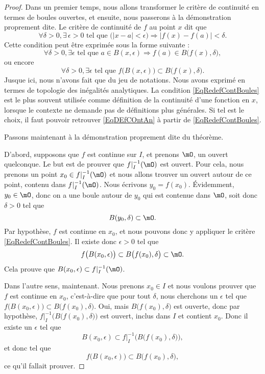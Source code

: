 \begin{proof}

	Dans un premier temps, nous allons transformer le critère de continuité en termes de boules ouvertes, et ensuite, nous passerons à la démonstration proprement dite. Le critère de continuité de \( f\) au point \( x\) dit que
	\begin{equation}        \label{EqDEfCOntAn}
		\forall \delta>0, \exists\,\epsilon>0\text{ tel que }\big( | x-a |< \epsilon \big)\Rightarrow| f(x)-f(a) |<\delta.
	\end{equation}
	Cette condition peut être exprimée sous la forme suivante :
	\[
		\forall \delta>0, \exists\epsilon\text{ tel que } a\in B(x,\epsilon)\Rightarrow f(a)\in B\big( f(x),\delta \big),
	\]
	ou encore
	\begin{equation}        \label{EqRedefContBoules}
		\forall \delta>0,\exists\epsilon\text{ tel que } f\big( B(x,\epsilon) \big)\subset B\big( f(x),\delta \big).
	\end{equation}
	Jusque ici, nous n'avons fait que du jeu de notations. Nous avons exprimé en termes de topologie des inégalités analytiques. La condition \eqref{EqRedefContBoules} est le plus souvent utilisée comme définition de la continuité d'une fonction en \( x\), lorsque le contexte ne demande pas de définitions plus générales. Si tel est le choix, il faut pouvoir retrouver \eqref{EqDEfCOntAn} à partir de \eqref{EqRedefContBoules}.

	Passons maintenant à la démonstration proprement dite du théorème.

	D'abord, supposons que \( f\) est continue sur \( I\), et prenons \( \mO\), un ouvert quelconque. Le but est de prouver que \( f|_I^{-1}(\mO)\) est ouvert. Pour cela, nous prenons un point \( x_0\in f|_I^{-1}(\mO)\) et nous allons trouver un ouvert autour de ce point, contenu dans \( f|_I^{-1}(\mO)\). Nous écrivons \( y_0=f(x_0)\). Évidemment, \( y_0\in\mO\), donc on a une boule autour de \( y_0\) qui est contenue dans \( \mO\), soit donc \( \delta>0\) tel que
	\[
		B(y_0,\delta)\subset\mO.
	\]
	Par hypothèse, \( f\) est continue en \( x_0\), et nous pouvons donc y appliquer le critère \eqref{EqRedefContBoules}. Il existe donc \( \epsilon>0\) tel que
	\[
		f\big( B(x_0,\epsilon) \big)\subset B\big( f(x_0),\delta \big)\subset\mO.
	\]
	Cela prouve que \( B(x_0,\epsilon)\subset f|_I^{-1}(\mO)\).

	Dans l'autre sens, maintenant. Nous prenons \( x_0\in I\) et nous voulons prouver que \( f\) est continue en \( x_0\), c'est-à-dire que pour tout \( \delta\), nous cherchons un \( \epsilon\) tel que \( f\big( B(x_0,\epsilon) \big)\subset B\big( f(x_0),\delta \big)\). Oui, mais \( B\big( f(x_0),\delta \big)\) est ouverte, donc par hypothèse, \( f|_I^{-1}\Big( B\big( f(x_0),\delta \big) \Big)\) est ouvert, inclus dans \( I\) et contient \( x_0\). Donc il existe un \( \epsilon\) tel que
	\[
		B(x_0,\epsilon)\subset f|_I^{-1}\Big( B\big( f(x_0),\delta \big) \Big),
	\]
	et donc tel que
	\[
		f\big( B(x_0,\epsilon) \big)\subset B\big( f(x_0),\delta \big),
	\]
	ce qu'il fallait prouver.
\end{proof}

